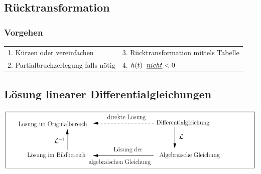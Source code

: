 	\subsection{Rücktransformation}
		\subsubsection{Vorgehen}
			\begin{tabular}{p{6cm}p{6cm}}
				1. Kürzen oder vereinfachen &
				3. Rücktransformation mittels Tabelle \\
				2. Partialbruchzerlegung falls nötig &
				4. $h(t)\hspace{0.2cm}\underline{nicht} < 0$ \\
			\end{tabular}
	
	\subsection{Lösung linearer Differentialgleichungen}
				\includegraphics[width=14cm]{./bilder/diffgleichungen.png}
				